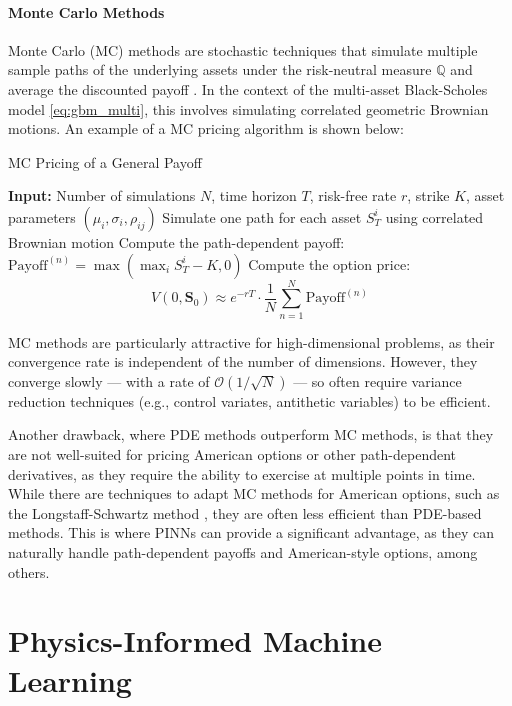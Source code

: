 \documentclass[12pt]{report} %
\theoremstyle{plain}           %
\theoremstyle{definition}      %
\theoremstyle{remark}          %
\begin{document}
\subsubsection{Monte Carlo Methods}
Monte Carlo (MC) methods are stochastic techniques that simulate multiple sample paths 
of the underlying assets under the risk-neutral measure $\mathbb{Q}$ and average the 
discounted payoff \cite{glasserman2004monte}. In the context of the multi-asset Black-Scholes 
model \eqref{eq:gbm_multi}, this involves simulating correlated geometric Brownian motions. 
An example of a MC pricing algorithm is shown below:
\begin{algorithm}[H]
	\caption{MC Pricing of a General Payoff}
	\begin{algorithmic}[1]
	\STATE \textbf{Input:} Number of simulations $N$, time horizon $T$, risk-free rate $r$, strike $K$, asset parameters $(\mu_i, \sigma_i, \rho_{ij})$
	  \STATE Simulate one path for each asset $S_T^i$ using correlated Brownian motion
	  \STATE Compute the path-dependent payoff: $\text{Payoff}^{(n)} = \max\left(\max_i S_T^{i} - K, 0\right)$
	\ENDFOR
	\STATE Compute the option price:
	\[
	V(0, \mathbf{S}_0) \approx e^{-rT} \cdot \frac{1}{N} \sum_{n=1}^{N} \text{Payoff}^{(n)}
	\]
	\end{algorithmic}
\end{algorithm}
MC methods are particularly attractive for high-dimensional problems, 
as their convergence rate is independent of the number of dimensions. However, 
they converge slowly — with a rate of $\mathcal{O}(1/\sqrt{N})$ — so often require 
variance reduction techniques (e.g., control variates, antithetic variables) to be 
efficient.

Another drawback, where PDE methods outperform MC methods, is that they are not well-suited for
pricing American options or other path-dependent derivatives, as they require
the ability to exercise at multiple points in time. While there are techniques to adapt MC 
methods for American options, such as the Longstaff-Schwartz method \cite{longstaffshawrtz}, they are often less
efficient than PDE-based methods. This is where PINNs can provide a significant advantage, 
as they can naturally handle path-dependent payoffs and American-style options, among others.

\chapter{Physics-Informed Machine Learning}
\end{document}
